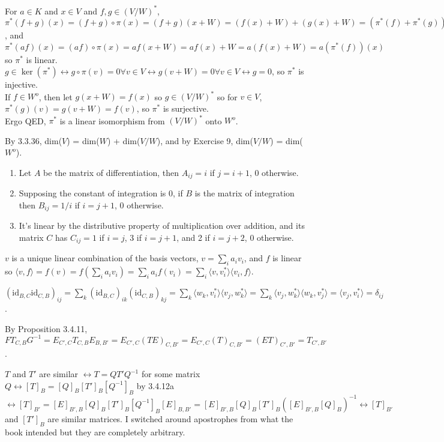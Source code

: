 \documentclass[11pt, oneside]{article}   	%
\newcommand{\inv}{^{-1}}
\newcommand{\be}{\begin{enumerate}}
\newcommand{\ee}{\end{enumerate}}
\newcommand{\lra}{\leftrightarrow}
\begin{document}
\item For $a \in K$ and $x\in V$ and $f, g \in (V/W)^*$, $\pi^*(f + g)(x) = (f + g)\circ \pi(x) = (f + g)(x + W) = (f(x) + W) + (g(x) + W) = (\pi^*(f)+ \pi^*(g))(x)$, and $\pi^*(af)(x) = (af) \circ \pi(x) = af(x + W) = af(x) + W = a(f(x) + W) = a(\pi^*(f))(x)$ so $\pi^*$ is linear. \\
$g \in \ker(\pi^*) \lra g \circ \pi(v) = 0 \forall v \in V \lra g(v + W) = 0 \forall v \in V \lra g = 0$, so $\pi^*$ is injective. \\
If $f \in W^o$, then let $g(x + W) = f(x)$ so $g \in (V/W)^*$ so for $v \in V$, $\pi^*(g)(v) = g(v + W)  = f(v)$, so $\pi^*$ is surjective. \\
Ergo QED, $\pi^*$ is a linear isomorphism from $(V/W)^*$ onto $W^o$.
\item By 3.3.36, dim($V$) = dim($W$) + dim($V/W$), and by Exercise 9, dim($V/W$) = dim($W^o$).
\item \be
\item Let $A$ be the matrix of differentiation, then $A_{ij} = i$ if $j = i + 1$, 0 otherwise.
\item Supposing the constant of integration is 0, if $B$ is the matrix of integration then $B_{ij} = 1/i$ if $i = j + 1$, 0 otherwise.
\item It's linear by the distributive property of multiplication over addition, and its matrix $C$ has $C_{ij} = 1$ if $i = j$, 3 if $i = j + 1$, and 2 if $i = j + 2$, 0 otherwise.
\ee
\item $v$ is a unique linear combination of the basis vectors, $v = \sum_i a_i v_i$, and $f$ is linear so $\langle v, f\rangle = f(v) = f(\sum_ia_iv_i) = \sum_ia_if(v_i) = \sum_i \langle v, v_i^* \rangle\langle v_i, f \rangle$.
\item $(\text{id}_{B,C}\text{id}_{C, B})_{ij} = \sum_k(\text{id}_{B,C})_{ik}(\text{id}_{C, B})_{kj} = \sum_k\langle w_k, v_i^*\rangle\langle v_j, w_k^*\rangle = \sum_k \langle v_j, w_k^*\rangle\langle w_k, v_j^*\rangle = \langle v_j, v_i^*\rangle = \delta_{ij}$.
\item By Proposition 3.4.11, $FT_{C, B}G\inv = E_{C', C}T_{C, B}E_{B, B'} = E_{C', C}(TE)_{C, B'} = E_{C', C}(T)_{C, B'} = (ET)_{C', B'} = T_{C', B'}$.
\item $T$ and $T'$ are similar $\lra T = QT'Q\inv$ for some matrix $Q \lra [T]_B = [Q]_B[T']_B[Q\inv]_B$ by 3.4.12a $ \lra [T]_{B'} = [E]_{B', B}[Q]_B[T']_B[Q\inv]_B[E]_{B, B'}  = [E]_{B', B}[Q]_B[T']_B([E]_{B', B}[Q]_B)\inv\lra [T]_{B'}$ and $[T']_B$ are similar matrices. I switched around apostrophes from what the book intended but they are completely arbitrary.
\end{document}
